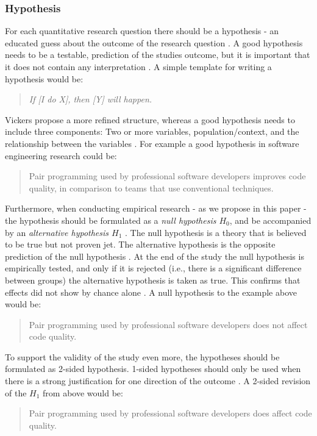 
\subsubsection{Hypothesis}

For each quantitative research question there should be a hypothesis - an educated guess about the outcome of the research question \cite{Buddies2010,Farrugia2009}. A good hypothesis needs to be a testable, prediction of the studies outcome, but it is important that it does not contain any interpretation \cite{Prasad2001}. A simple template for writing a hypothesis would be:
\begin{quote}
	 \emph{If [I do X], then [Y] will happen.} \cite{Buddies2010}
\end{quote}
Vickers \etal propose a more refined structure, whereas a good hypothesis needs to include three components: Two or more variables, population/context, and the relationship between the variables \cite{Vickers}.  For example a good hypothesis in software engineering research could be: 
\begin{quote}
	Pair programming used by professional software developers improves code quality, in comparison to teams that use conventional techniques.
\end{quote}
Furthermore, when conducting empirical research - as we propose in this paper - the hypothesis should be formulated as a \emph{null hypothesis $H_0$}, and be accompanied by an \emph{alternative hypothesis $H_1$} \cite{Farrugia2009}. The null hypothesis is a theory that is believed to be true but not proven jet. The alternative hypothesis is the opposite prediction of the null hypothesis \cite{Prasad2001}. At the end of the study the null hypothesis is empirically tested, and only if it is rejected (i.e., there is a significant difference between groups) the alternative hypothesis is taken as true. This confirms that effects did not show by chance alone \cite{Farrugia2009}. A null hypothesis to the example above would be:
\begin{quote}
	Pair programming used by professional software developers does not affect code quality. 
\end{quote}
To support the validity of the study even more, the hypotheses should be formulated as 2-sided hypothesis. \cite[p.280]{Farrugia2009} 1-sided hypotheses should only be used when there is a strong justification for one direction of the outcome \cite{Farrugia2009}. A 2-sided revision of the $H_1$ from above would be: 
\begin{quote}
	Pair programming used by professional software developers does affect code quality. 	
\end{quote}
